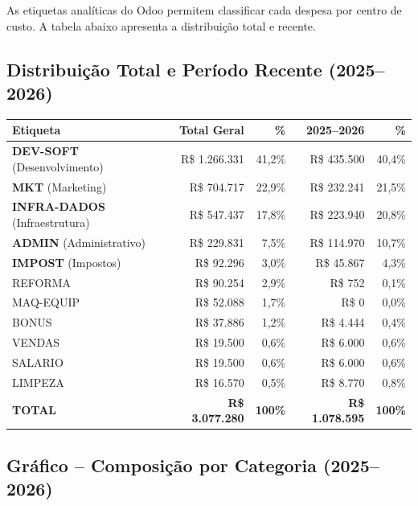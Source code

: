 \documentclass[12pt, a4paper]{article}
\newcommand{\reais}[1]{R\$ #1}
\begin{document}
As etiquetas analíticas do Odoo permitem classificar cada despesa por centro de custo. A tabela abaixo apresenta a distribuição total e recente.

\subsection{Distribuição Total e Período Recente (2025--2026)}

\begin{table}[H]
    \centering
    \small
    \renewcommand{\arraystretch}{1.3}
    \begin{tabularx}{\textwidth}{X r r r r}
        \toprule
        \rowcolor{tableHeader} \textbf{Etiqueta} & \textbf{Total Geral} & \textbf{\%} & \textbf{2025--2026} & \textbf{\%} \\
        \midrule
        \textbf{DEV-SOFT} (Desenvolvimento) & \reais{1.266.331} & 41,2\% & \reais{435.500} & 40,4\% \\
        \textbf{MKT} (Marketing) & \reais{704.717} & 22,9\% & \reais{232.241} & 21,5\% \\
        \textbf{INFRA-DADOS} (Infraestrutura) & \reais{547.437} & 17,8\% & \reais{223.940} & 20,8\% \\
        \textbf{ADMIN} (Administrativo) & \reais{229.831} & 7,5\% & \reais{114.970} & 10,7\% \\
        \textbf{IMPOST} (Impostos) & \reais{92.296} & 3,0\% & \reais{45.867} & 4,3\% \\
        REFORMA & \reais{90.254} & 2,9\% & \reais{752} & 0,1\% \\
        MAQ-EQUIP & \reais{52.088} & 1,7\% & \reais{0} & 0,0\% \\
        BONUS & \reais{37.886} & 1,2\% & \reais{4.444} & 0,4\% \\
        VENDAS & \reais{19.500} & 0,6\% & \reais{6.000} & 0,6\% \\
        SALARIO & \reais{19.500} & 0,6\% & \reais{6.000} & 0,6\% \\
        LIMPEZA & \reais{16.570} & 0,5\% & \reais{8.770} & 0,8\% \\
        \midrule
        \rowcolor{lightGray} \textbf{TOTAL} & \textbf{\reais{3.077.280}} & \textbf{100\%} & \textbf{\reais{1.078.595}} & \textbf{100\%} \\
        \bottomrule
    \end{tabularx}
\end{table}

\subsection{Gráfico -- Composição por Categoria (2025--2026)}
\end{document}
